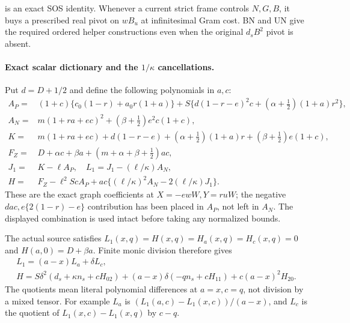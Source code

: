 is an exact SOS identity.  Whenever a current strict frame controls
$N,G,B$, it buys a prescribed real pivot on $wB_u$ at
infinitesimal Gram cost.  BN and UN give the required ordered helper
constructions even when the original $d_sB^2$ pivot is absent.

\paragraph{Exact scalar dictionary and the $1/\kappa$ cancellations.}
Put $d=D+1/2$ and define the following polynomials in $a,c$:
\[
\begin{split}
 A_P={}&(1+c)\{c_0(1-r)+a_0r(1+a)\}
       +S\{d(1-r-e)^2c+(\alpha+\tfrac12)(1+a)r^2\},\\
 A_N={}&m(1+ra+ec)^2+(\beta+\tfrac12)e^2c(1+c),\\
 K={}&m(1+ra+ec)+d(1-r-e)
       +(\alpha+\tfrac12)(1+a)r+(\beta+\tfrac12)e(1+c),\\
 F_Z={}&D+\alpha c+\beta a+(m+\alpha+\beta+\tfrac12)ac,\\
 J_1={}&K-\ell A_P,\quad L_1=J_1-(\ell/\kappa)A_N,\\
 H={}&F_Z-\ell^2ScA_P
                 +ac\{(\ell/\kappa)^2A_N-2(\ell/\kappa)J_1\}.
\end{split}\tag{SN9}
\]
These are the exact graph coefficients at $X=-ewW,Y=ruW$;
the negative $dac,e\{2(1-r)-e\}$ contribution has been placed
in $A_P$, not left in $A_N$. The displayed combination is used intact before taking any
normalized bounds.

The actual source satisfies
$L_1(x,q)=H(x,q)=H_a(x,q)=H_c(x,q)=0$ and
$H(a,0)=D+\beta a$. Finite monic division therefore gives
\[
\begin{gathered}
 L_1=(a-x)L_a+\delta L_c,\\
 H=S\delta^2(d_s+\kappa n_s+cH_{02})
        +(a-x)\delta(-qn_s+cH_{11})+c(a-x)^2H_{20}.
\end{gathered}\tag{SN10}
\]
The quotients mean literal polynomial differences at $a=x,c=q$,
not division by a mixed tensor. For example $L_a$ is
$(L_1(a,c)-L_1(x,c))/(a-x)$, and $L_c$ is the quotient of
$L_1(x,c)-L_1(x,q)$ by $c-q$.

